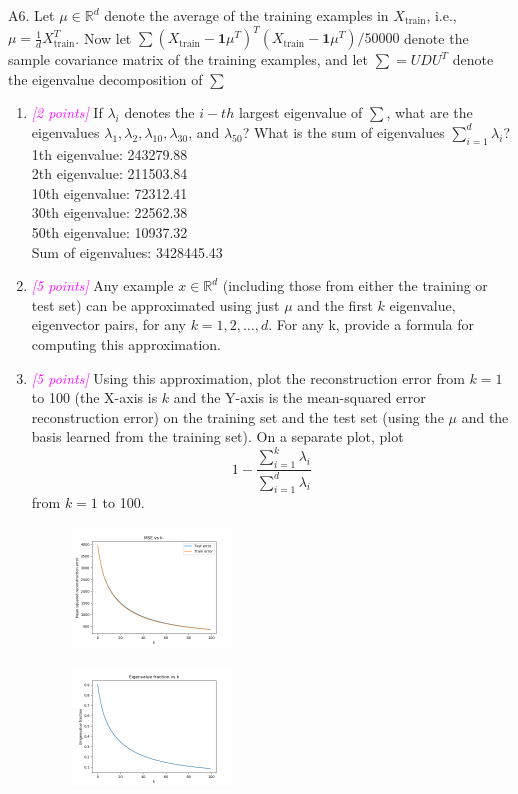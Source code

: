 \documentclass{article}
\newcommand{\field}[1]{\mathbb{#1}}
\newcommand{\1}{\mathbf{1}}
\newcommand{\R}{\field{R}} %
\newcommand{\points}[1]{\small\textcolor{magenta}{\emph{[#1 points]}} \normalsize}
\begin{document}
A6. Let $\mu\in\R^d$ denote the average of the training examples in $X_{\text{train}}$, i.e., $\mu = \frac{1}{d} X^T_{\text{train}}$. Now let $\sum (X_{\text{train}} - \1 \mu^T)^T (X_{\text{train}} - \1\mu^T)/50000$ denote the sample covariance matrix of the training examples, and let $\sum =UDU^T$ denote the eigenvalue decomposition of $\sum$
\begin{enumerate}
    \item \points{2} If $\lambda_i$ denotes the $i-th$ largest eigenvalue of $\sum$, what are the eigenvalues $\lambda_1, \lambda_2, \lambda_{10}, \lambda_{30}$, and $\lambda_{50}$? What is the sum of eigenvalues $\sum^d_{i=1}\lambda_i$? \\
    1th eigenvalue: 243279.88 \\
    2th eigenvalue: 211503.84 \\
    10th eigenvalue: 72312.41 \\
    30th eigenvalue: 22562.38 \\
    50th eigenvalue: 10937.32 \\
    Sum of eigenvalues: 3428445.43 \\

    
    \item \points{5} Any example $x\in\R^d$ (including those from either the training or test set) can be approximated using just $\mu$ and the first $k$ eigenvalue, eigenvector pairs, for any $k=1,2,\hdots,d$.  For any k, provide a formula for computing this approximation.
    
    \newpage
    \item \points{5} Using this approximation, plot the reconstruction error from $k=1$ to 100 (the X-axis is $k$ and the Y-axis is the mean-squared error reconstruction error) on the training set and the test set (using the $\mu$ and the basis learned from the training set). On a separate plot, plot 
    $$1 - \frac{\sum^k_{i=1}\lambda_i}{\sum^d_{i=1}\lambda_i}$$
    from $k=1$ to 100. \\
    \begin{figure}[h!]
    \centering 
    \includegraphics[width=0.4\textwidth]{HW3/HW3_plots/A6a_MSE.png}
    \end{figure}
    \begin{figure}[h!]
    \centering 
    \includegraphics[width=0.4\textwidth]{HW3/HW3_plots/A6a_EigenFrac.png}
    \end{figure}
    

\end{enumerate}
\end{document}
